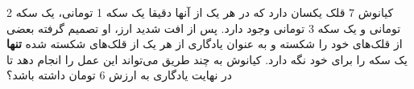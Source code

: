 \p    
کیانوش 7 قلک یکسان دارد که در هر یک از آنها دقیقا یک سکه 1 تومانی، یک سکه 2 تومانی و یک سکه 3 تومانی وجود دارد. پس از افت شدید ارز، او تصمیم گرفته بعضی از قلک‌های خود را شکسته و به عنوان یادگاری
از هر یک از قلک‌های شکسته شده 
\textbf{تنها}
یک سکه را برای خود نگه دارد. کیانوش به چند طریق می‌تواند این عمل را انجام دهد تا در نهایت یادگاری به ارزش 6 تومان داشته باشد؟
